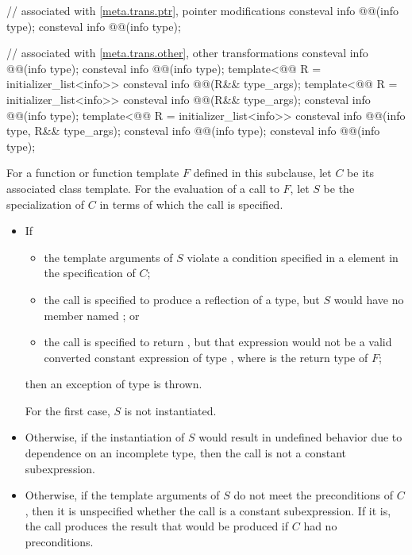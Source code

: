 \begin{codeblock}
// associated with \ref{meta.trans.ptr}, pointer modifications
consteval info @@(info type);
consteval info @@(info type);

// associated with \ref{meta.trans.other}, other transformations
consteval info @@(info type);
consteval info @@(info type);
template<@@ R = initializer_list<info>>
  consteval info @@(R&& type_args);
template<@@ R = initializer_list<info>>
  consteval info @@(R&& type_args);
consteval info @@(info type);
template<@@ R = initializer_list<info>>
  consteval info @@(info type, R&& type_args);
consteval info @@(info type);
consteval info @@(info type);
\end{codeblock}

\pnum
For a function or function template $F$ defined in this subclause,
let $C$ be its associated class template.
For the evaluation of a call to $F$,
let $S$ be the specialization of $C$ in terms of which the call is specified.
\begin{itemize}
\item
  If
  \begin{itemize}
  \item
    the template arguments of $S$ violate a condition specified
    in a  element in the specification of $C$;
  \item
    the call is specified to produce a reflection of a type,
    but $S$ would have no member named ; or
  \item
    the call is specified to return ,
    but that expression would not be a valid converted constant expression of type ,
    where  is the return type of $F$;
  \end{itemize}
  then an exception of type  is thrown.
  \begin{note}
  For the first case, $S$ is not instantiated.
  \end{note}
  \item
    Otherwise, if the instantiation of $S$ would result in undefined behavior
    due to dependence on an incomplete type,
    then the call is not a constant subexpression.
  \item
    Otherwise, if the template arguments of $S$ do not meet the preconditions of $C$,
    then it is unspecified whether the call is a constant subexpression.
    If it is, the call produces the result
    that would be produced if $C$ had no preconditions.
\end{itemize}

